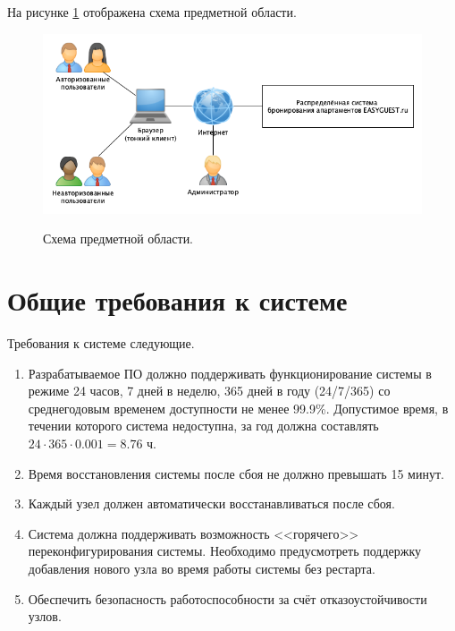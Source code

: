 На рисунке \ref{fig:schema} отображена схема предметной области.
\begin{figure}[h]
	\begin{center}
		{\includegraphics[scale = 0.6]{img/pic/general.png}}
		\caption{Схема предметной области.}
		\label{fig:schema}
	\end{center}
\end{figure}

\pagebreak

\section*{Общие требования к системе}
Требования к системе следующие.
\begin{enumerate}
	\item Разрабатываемое ПО должно поддерживать функционирование системы в режиме 24 часов, 7 дней в неделю, 365 дней в году (24/7/365) со среднегодовым временем доступности не менее 99.9\%. Допустимое время, в течении которого система недоступна, за год должна составлять $24\cdot365\cdot0.001=8.76$ ч.
	
	\item Время восстановления системы после сбоя не должно превышать 15 минут.
	
	\item Каждый узел должен автоматически восстанавливаться после сбоя.
	
	\item Система должна поддерживать возможность <<горячего>> переконфигурирования системы. Необходимо предусмотреть поддержку добавления нового узла во время работы системы без рестарта.
	
	\item Обеспечить безопасность работоспособности за счёт отказоустойчивости узлов.
\end{enumerate}

